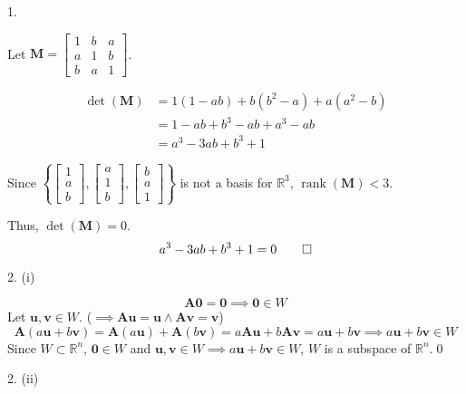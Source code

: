 \documentclass[a4paper]{article}
\newcommand{\vv}{\mathbf}
\begin{document}
1.

Let \(\vv M=\begin{bmatrix}
                1&b&a\\
                a&1&b\\
                b&a&1
        \end{bmatrix}\).

\[\begin{aligned}
        \det(\vv M)&=1(1-ab)+b\left(b^2-a\right)+a\left(a^2-b\right)\\
                       &=1-ab+b^3-ab+a^3-ab\\
                       &=a^3-3ab+b^3+1
\end{aligned}\]

Since \(\left\{
        \begin{bmatrix}
        1\\a\\b
        \end{bmatrix},
        \begin{bmatrix}
        a\\1\\b
        \end{bmatrix},
        \begin{bmatrix}
        b\\a\\1
        \end{bmatrix}\right\}\)
        is not a basis for \(\mathbb R^3\), \(\operatorname{rank}(\vv M)<3\).

        Thus, \(\det(\vv M)=0\).
        \[a^3-3ab+b^3+1=0\qed\]


2. (i)

\[\vv A\vv0=\vv0\implies\vv0\in W\]
Let \(\vv u,\vv v\in W\).
(\(\implies\vv A\vv u=\vv u\land\vv A\vv v=\vv v\))
\[\vv A(a\vv u+b\vv v)
        =\vv A(a\vv u)+\vv A(b\vv v)
        =a\vv A\vv u+b\vv A\vv v
        =a\vv u+b\vv v
\implies a\vv u+b\vv v\in W\]
Since \(W\subset\mathbb R^n\), \(\vv0\in W\)
and \(\vv u,\vv v\in W\implies a\vv u+b\vv v\in W\),
\(W\) is a subspace of \(\mathbb R^n\).\qed


2. (ii)
\end{document}

